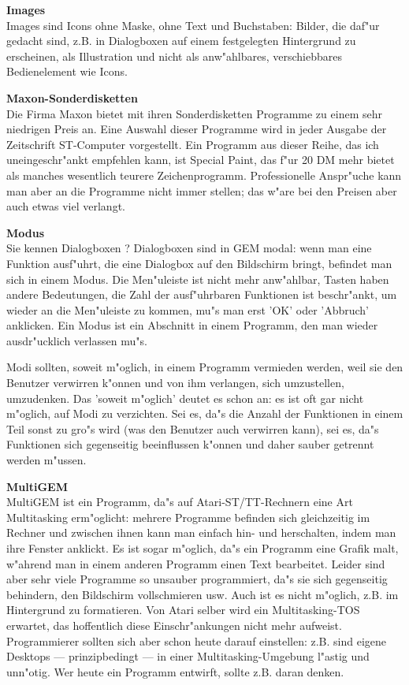 \begin{appendix}
{\bf Images} \\ 
Images sind Icons ohne Maske, ohne Text und Buchstaben: Bilder,
die daf"ur gedacht sind, z.B. in Dialogboxen auf einem festgelegten
Hintergrund zu erscheinen, als Illustration und nicht als
anw"ahlbares, verschiebbares Bedienelement wie Icons.

{\bf Maxon-Sonderdisketten} \\ 
Die Firma Maxon bietet mit ihren Sonderdisketten Programme zu einem
sehr niedrigen Preis an. Eine Auswahl dieser Programme wird in 
jeder Ausgabe der Zeitschrift ST-Computer vorgestellt. Ein 
Programm aus dieser Reihe, das ich uneingeschr"ankt empfehlen kann,
ist Special Paint, das f"ur 20 DM mehr bietet als manches wesentlich
teurere Zeichenprogramm. Professionelle Anspr"uche kann man aber
an die Programme nicht immer stellen; das w"are bei den Preisen aber
auch etwas viel verlangt.

{\bf Modus} \\ 
Sie kennen Dialogboxen ? Dialogboxen sind in GEM modal: wenn man 
eine Funktion ausf"uhrt, die eine Dialogbox auf den Bildschirm 
bringt, befindet man sich in einem Modus. Die Men"uleiste ist 
nicht mehr anw"ahlbar, Tasten haben andere Bedeutungen, die
Zahl der ausf"uhrbaren Funktionen ist beschr"ankt, um wieder
an die Men"uleiste zu kommen, mu"s man erst 'OK' oder 'Abbruch' 
anklicken. Ein Modus ist ein Abschnitt in einem Programm, den man
wieder ausdr"ucklich verlassen mu"s. 

Modi sollten, soweit m"oglich, in einem Programm vermieden werden,
weil sie den Benutzer verwirren k"onnen und von ihm verlangen,
sich umzustellen, umzudenken. Das 'soweit m"oglich' deutet es schon
an: es ist oft gar nicht m"oglich, auf Modi zu verzichten. Sei es,
da"s die Anzahl der Funktionen in einem Teil sonst zu gro"s wird 
(was den Benutzer auch verwirren kann), sei es, da"s Funktionen
sich gegenseitig beeinflussen k"onnen und daher sauber getrennt 
werden m"ussen. 

{\bf MultiGEM} \\ 
MultiGEM ist ein Programm, da"s auf Atari-ST/TT-Rechnern eine Art
Multitasking erm"oglicht: mehrere Programme befinden sich 
gleichzeitig im Rechner und zwischen ihnen kann man einfach hin-
und herschalten, indem man ihre Fenster anklickt. Es ist sogar
m"oglich, da"s ein Programm eine Grafik malt, w"ahrend man in einem
anderen Programm einen Text bearbeitet. Leider sind aber sehr viele
Programme so unsauber programmiert, da"s sie sich gegenseitig 
behindern, den Bildschirm vollschmieren usw. Auch ist es nicht 
m"oglich, z.B. im Hintergrund zu formatieren. Von Atari selber wird
ein Multitasking-TOS erwartet, das hoffentlich diese 
Einschr"ankungen nicht mehr aufweist. Programmierer sollten sich
aber schon heute darauf einstellen: z.B. sind eigene Desktops --- 
prinzipbedingt --- in einer Multitasking-Umgebung l"astig und
unn"otig. Wer heute ein Programm entwirft, sollte z.B. daran denken.


\end{appendix}
